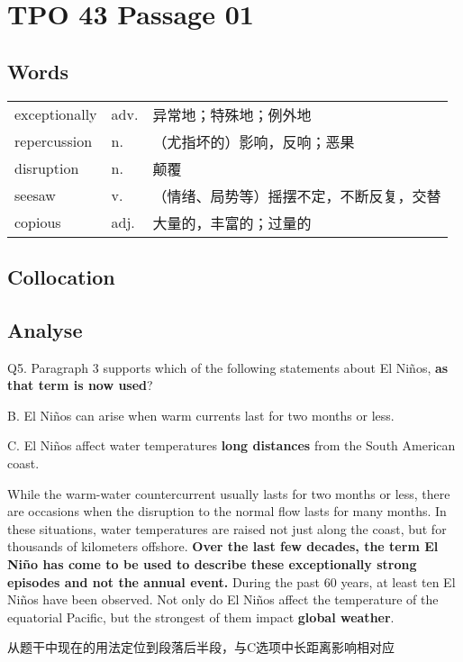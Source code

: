 \section{TPO 43 Passage 01}

\subsection{Words}

\begin{tabular}{lll}
    exceptionally & adv. & 异常地；特殊地；例外地          \\
    repercussion  & n.   & （尤指坏的）影响，反响；恶果       \\
    disruption    & n.   & 颠覆                   \\
    seesaw        & v.   & （情绪、局势等）摇摆不定，不断反复，交替 \\
    copious       & adj. & 大量的，丰富的；过量的          \\
\end{tabular}

\subsection{Collocation}

\newpage

\subsection{Analyse}

\begin{blk}
    \begin{qst}
        Q5. Paragraph 3 supports which of the following statements about El Niños, \textbf{as that term is now used}?
    \end{qst}

    \begin{chc}
        B. El Niños can arise when warm currents last for two months or less.

        C. El Niños affect water temperatures \textbf{long distances} from the South American coast.
    \end{chc}

    \begin{psgq}
        While the warm-water countercurrent usually lasts for two months or less, there are occasions when the disruption to the normal flow lasts for many months. In these situations, water temperatures are raised not just along the coast, but for thousands of kilometers offshore. \textbf{Over the last few decades, the term El Niño has come to be used to describe these exceptionally strong episodes and not the annual event.} During the past 60 years, at least ten El Niños have been observed. Not only do El Niños affect the temperature of the equatorial Pacific, but the strongest of them impact \textbf{global weather}.
    \end{psgq}

    \begin{nlz}
        从题干中现在的用法定位到段落后半段，与C选项中长距离影响相对应
    \end{nlz}
\end{blk}

